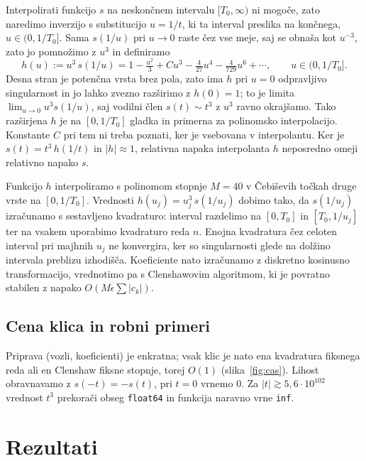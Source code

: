 \documentclass[11pt,a4paper]{article}
\begin{document}
Interpolirati funkcijo $s$ na neskončnem intervalu $[T_0, \infty)$ ni mogoče,
zato naredimo inverzijo s substitucijo $u = 1/t$, ki ta interval preslika na
končnega, $u \in (0, 1/T_0]$. Sama $s(1/u)$ pri $u \to 0$ raste čez vse meje,
saj se obnaša kot $u^{-3}$, zato jo pomnožimo z $u^3$ in definiramo
\begin{equation}
  h(u) := u^3\, s(1/u)
        = 1 - \tfrac{u^2}{3} + C u^3 - \tfrac{4}{27}u^4
          - \tfrac{4}{729}u^6 + \cdots, \qquad u \in (0, 1/T_0].
\end{equation}
Desna stran je potenčna vrsta brez pola, zato ima $h$ pri $u = 0$ odpravljivo
singularnost in jo lahko zvezno razširimo z $h(0) = 1$; to je limita
$\lim_{u\to 0} u^3 s(1/u)$, saj vodilni člen $s(t) \sim t^3$ z $u^3$ ravno
okrajšamo. Tako razširjena $h$ je na $[0, 1/T_0]$ gladka in primerna za
polinomsko interpolacijo. Konstante $C$ pri tem ni treba poznati, ker je
vsebovana v interpolantu. Ker je $s(t) = t^3\, h(1/t)$ in $|h| \approx 1$,
relativna napaka interpolanta $h$ neposredno omeji relativno napako $s$.

Funkcijo $h$ interpoliramo s polinomom stopnje $M = 40$ v Čebiševih točkah
druge vrste na $[0, 1/T_0]$. Vrednosti $h(u_j) = u_j^3\, s(1/u_j)$ dobimo
tako, da $s(1/u_j)$ izračunamo s sestavljeno kvadraturo: interval razdelimo na
$[0, T_0]$ in $[T_0, 1/u_j]$ ter na vsakem uporabimo kvadraturo reda $n$.
Enojna kvadratura čez celoten interval pri majhnih $u_j$ ne konvergira, ker so
singularnosti glede na dolžino intervala preblizu izhodišča. Koeficiente nato
izračunamo z diskretno kosinusno transformacijo, vrednotimo pa s Clenshawovim
algoritmom, ki je povratno stabilen z napako $O(M\epsilon\sum|c_k|)$.

\subsection{Cena klica in robni primeri}

Priprava (vozli, koeficienti) je enkratna; vsak klic je nato ena kvadratura
fiksnega reda ali en Clenshaw fiksne stopnje, torej $O(1)$
(slika~\ref{fig:cas}). Lihost obravnavamo z $s(-t) = -s(t)$, pri $t=0$ vrnemo $0$. 
Za $|t| \gtrsim 5{,}6\cdot 10^{102}$ vrednost $t^3$ prekorači obseg
\texttt{float64} in funkcija naravno vrne \texttt{inf}.

\section{Rezultati}
\end{document}
